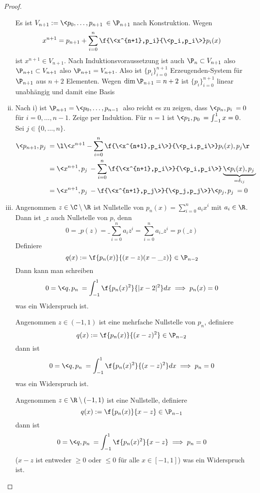\documentclass[11pt]{scrartcl}
\begin{document}
\begin{lem}
\begin{proof}
\begin{enumerate}[i)]
				Es ist $V_{n+1} := \<p_0,\dotsc,p_{n+1}\> \in \P_{n+1}$ nach Konstruktion.
				Wegen
				\[
					x^{n+1} = p_{n+1} + \sum_{i=0}^n \f {\<x^{n+1},p_i}{\<p_i,p_i\>} p_i(x)
				\]
				ist $x^{n+1} \in V_{n+1}$.
				Nach Induktionsvoraussetzung ist auch $\P_n \subset V_{n+1}$ also $\P_{n+1}\subset V_{n+1}$ also $\P_{n+1} = V_{n+1}$.
				Also ist $\{p_i\}_{i=0}^{n+1}$ Erzeugenden-System für $\P_{n+1}$ aus $n+2$ Elementen.
				Wegen $\dim \P_{n+1} = n+2$ ist $\{p_i\}_{i=0}^{n+1}$ linear unabhängig und damit eine Basis
			\item
				Nach i) ist $\P_{n+1} = \<p_0,\dotsc, p_{n-1}\>$ also reicht es zu zeigen, dass $\<p_n,p_i\>=0$ für $i=0,\dotsc, n-1$.
				Zeige per Induktion.
				Für $n=1$ ist $\<p_1,p_0\> = \int_{-1}^1 x = 0$.
				Sei $j\in \{0,\dotsc,n\}$.
				\begin{align*}
					\<p_{n+1},p_j\> 
					&= \l\< x^{n+1}- \sum_{i=0}^n \f {\<x^{n+1},p_i\>}{\<p_i,p_i\>} p_i(x) , p_j\r\> \\
					&= \<x^{n+1},p_j\> - \sum_{i=0}^n \f{\<x^{n+1},p_i\>}{\<p_i,p_i\>} \underbrace{\<p_i(x),p_j\> }_{= \delta_{ij}} \\
					&= \<x^{n+1},p_j\> - \f {\<x^{n+1},p_j\>}{\<p_j,p_j\>} \<p_j,p_j\> = 0
				\end{align*}
			\item
				Angenommen $z\in \C\setminus \R$ ist Nullstelle von $p_n(x) = \sum_{i=0}^n a_i x^i$ mit $a_i\in \R$.
				Dann ist $\_z$ auch Nullstelle von $p$, denn
				\[
					0 = \_{p(z)} = \_{\sum_{i=0}^n a_i z^i} = \sum_{i=0}^n a_i\_{z}^i = p(\_z)
				\]
				Definiere
				\[
					q(x) := \f {p_n(x)}{(x-z)(x-\_z)} \in \P_{n-2}
				\]
				Dann kann man schreiben
				\[
					0 = \<q,p_n\> = \int_{-1}^1 \f {p_n(x)^2}{|x-2|^2} dx \implies p_n(x) = 0
				\]
				was ein Widerspruch ist.

				Angenommen $z\in (-1,1)$ ist eine mehrfache Nullstelle von $p_n$, definiere
				\[
					q(x) := \f {p_n(x)}{(x-z)^2} \in \P_{n-2}
				\]
				dann ist
				\[
					0= \<q,p_n\> = \int_{-1}^1 \f {p_n(x)^2}{(x-z)^2} dx  \implies p_n = 0
				\]
				was ein Widerspruch ist.

				Angenommen $z\in \R\setminus (-1,1)$ ist eine Nullstelle, definiere
				\[
					q(x) := \f {p_n(x)}{x-z} \in \P_{n-1}
				\]
				dann ist
				\[
					0 = \<q,p_n\> = \int_{-1}^1 \f{p_n(x)^2}{x-z} \implies p_n = 0
				\]
				($x-z$ ist entweder $\ge 0$ oder $\le 0$ für alle $x\in [-1,1]$)
				was ein Widerspruch ist.


		\end{enumerate}
	\end{proof}
\end{lem}
\end{document}
